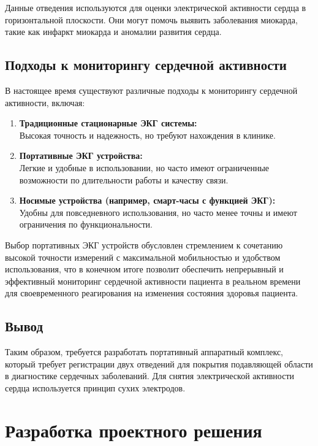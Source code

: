 \documentclass[12pt, russian]{extarticle}
\begin{document}
\begin{spacing}{1.5}
Данные отведения используются для оценки электрической активности сердца в горизонтальной плоскости. Они могут помочь выявить заболевания миокарда, такие как инфаркт миокарда и аномалии развития сердца.

\subsection{Подходы к мониторингу сердечной активности}

В настоящее время существуют различные подходы к мониторингу сердечной активности, включая:

\begin{enumerate}
    \item \textbf{Традиционные стационарные ЭКГ системы:} \\
        Высокая точность и надежность, но требуют нахождения в клинике.
    \item \textbf{Портативные ЭКГ устройства:} \\
        Легкие и удобные в использовании, но часто имеют ограниченные возможности по длительности работы и качеству связи.
    \item \textbf{Носимые устройства (например, смарт-часы с функцией ЭКГ):} \\ 
        Удобны для повседневного использования, но часто менее точны и имеют ограничения по функциональности.
\end{enumerate}

Выбор портативных ЭКГ устройств обусловлен стремлением к сочетанию высокой точности измерений с максимальной мобильностью и удобством использования, что в конечном итоге позволит обеспечить непрерывный и эффективный мониторинг сердечной активности пациента в реальном времени для своевременного реагирования на изменения состояния здоровья пациента.

\subsection{Вывод}

Таким образом, требуется разработать портативный аппаратный комплекс, который требует регистрации двух отведений для покрытия подавляющей области в диагностике сердечных заболеваний. Для снятия электрической активности сердца используется принцип сухих электродов.

\newpage
\section{Разработка проектного решения}


\end{spacing}
\end{document}
